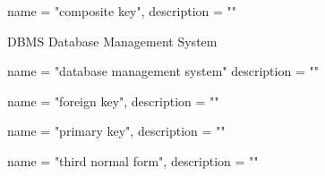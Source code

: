  {
    name = "composite key",
    description = ""}

 {DBMS} {Database Management System}

 {
    name = "database management system"
    description = ""}

 {
    name = "foreign key",
    description = ""}

 {
    name = "primary key",
    description = ""}

 {
    name = "third normal form",
    description = ""}

